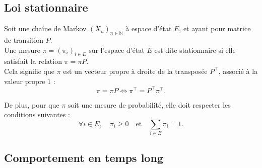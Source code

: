 \documentclass{article}
\begin{document}

\subsection{Loi stationnaire}

Soit une chaîne de Markov $(X_n)_{n \in \mathbb{N}}$ à espace d'état $E$, et ayant pour matrice de transition $P$. \\

Une mesure $\pi = (\pi_i)_{i \in E}$ sur l'espace d'état $E$ est dite stationnaire si elle satisfait la relation $\pi = \pi P$. \\

Cela signifie que $\pi$ est un vecteur propre à droite de la transposée $P^{\top}$, associé à la valeur propre $1$ :
\[
\pi = \pi P \iff \pi^{\top} = P^{\top} \pi^{\top}.
\]

De plus, pour que $\pi$ soit une mesure de probabilité, elle doit respecter les conditions suivantes :
\[
\forall i \in E, \quad \pi_i \geq 0 \quad \text{et} \quad \sum_{i \in E} \pi_i = 1.
\]

\subsection{Comportement en temps long}
\end{document}
